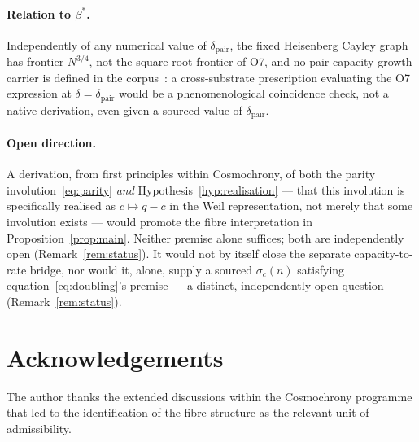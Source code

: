 \documentclass[11pt,a4paper]{article}
\theoremstyle{definition}
\newcommand{\bstar}{\beta^*}
\begin{document}
  \paragraph{Relation to $\bstar$.}
    Independently of any numerical value of $\delta_{\mathrm{pair}}$, the
    fixed Heisenberg Cayley graph has frontier $N^{3/4}$, not the
    square-root frontier of O7, and no pair-capacity growth carrier is
    defined in the corpus~\cite{Beau2026sgn}: a cross-substrate
    prescription evaluating the O7 expression at
    $\delta = \delta_{\mathrm{pair}}$ would be a phenomenological
    coincidence check, not a native derivation, even given a sourced
    value of $\delta_{\mathrm{pair}}$.

  \paragraph{Open direction.}
    A derivation, from first principles within Cosmochrony, of both the
    parity involution~\eqref{eq:parity} \emph{and}
    Hypothesis~\ref{hyp:realisation} --- that this involution is
    specifically realised as $c\mapsto q-c$ in the Weil representation,
    not merely that some involution exists --- would promote the fibre
    interpretation in Proposition~\ref{prop:main}.
    Neither premise alone suffices; both are independently open
    (Remark~\ref{rem:status}).
    It would not by itself close the separate capacity-to-rate bridge, nor
    would it, alone, supply a sourced $\sigma_c(n)$ satisfying
    equation~\eqref{eq:doubling}'s premise --- a distinct, independently
    open question (Remark~\ref{rem:status}).

  \section*{Acknowledgements}

  The author thanks the extended discussions within the Cosmochrony
  programme that led to the identification of the fibre structure
  as the relevant unit of admissibility.

  
  \begingroup
  \raggedright
  
  \endgroup
\end{document}
